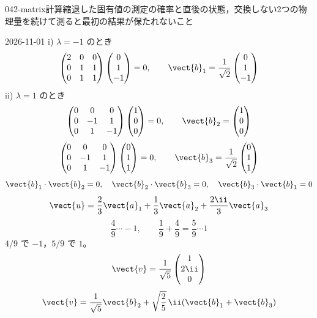 \documentclass[uplatex,dvipdfmx,a4paper,11pt]{jsarticle}
\begin{document}
\begin{mondai}{042-matrix}{計算}{縮退した固有値の測定の確率と直後の状態，交換しない2つの物理量を続けて測ると最初の結果が保たれないこと}
\begin{kotaeutsushi}{2026-11-01}
i) $\lambda=-1$ のとき
\[ \begin{pmatrix}2&0&0\\0&1&1\\0&1&1\end{pmatrix}\begin{pmatrix}0\\1\\-1\end{pmatrix}=0,\qquad\vect{b}_{1}=\frac{1}{\sqrt{2}}\begin{pmatrix}0\\1\\-1\end{pmatrix} \]
ii) $\lambda=1$ のとき
\[ \begin{pmatrix}0&0&0\\0&-1&1\\0&1&-1\end{pmatrix}\begin{pmatrix}1\\0\\0\end{pmatrix}=0,\qquad\vect{b}_{2}=\begin{pmatrix}1\\0\\0\end{pmatrix} \]
\[ \begin{pmatrix}0&0&0\\0&-1&1\\0&1&-1\end{pmatrix}\begin{pmatrix}0\\1\\1\end{pmatrix}=0,\qquad\vect{b}_{3}=\frac{1}{\sqrt{2}}\begin{pmatrix}0\\1\\1\end{pmatrix} \]
\[ \vect{b}_{1}\cdot\vect{b}_{2}=0,\quad\vect{b}_{2}\cdot\vect{b}_{3}=0,\quad\vect{b}_{3}\cdot\vect{b}_{1}=0 \]
\[ \vect{u}=\frac{2}{3}\vect{a}_{1}+\frac{1}{3}\vect{a}_{2}+\frac{2\ii}{3}\vect{a}_{3} \]
\[ \frac{4}{9}\cdots-1,\qquad\frac{1}{9}+\frac{4}{9}=\frac{5}{9}\cdots1 \]
$4/9$ で $-1$，$5/9$ で $1$。
\[ \vect{v}=\frac{1}{\sqrt{5}}\begin{pmatrix}1\\2\ii\\0\end{pmatrix} \]
\[ \vect{v}=\frac{1}{\sqrt{5}}\vect{b}_{2}+\sqrt{\frac{2}{5}}\,\ii(\vect{b}_{1}+\vect{b}_{3}) \]

\end{kotaeutsushi}
\end{mondai}
\end{document}
